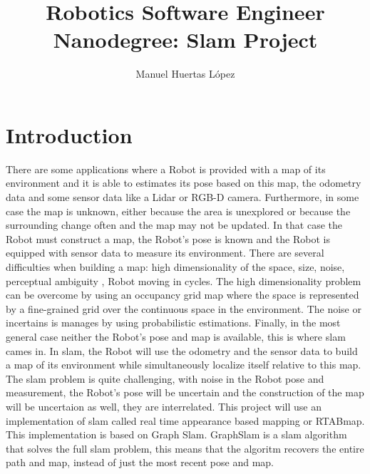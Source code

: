 \documentclass[10pt,journal,compsoc]{IEEEtran}
\begin{document}
	
\title{Robotics Software Engineer Nanodegree: Slam Project}
\author{Manuel Huertas L\'opez}

	
	
\maketitle
\IEEEdisplaynontitleabstractindextext
\IEEEpeerreviewmaketitle
\section{Introduction}
\label{sec:introduction}
\IEEEPARstart
{T}{here} are some applications where a Robot is provided with a map of its environment and it is able to estimates its pose based on this map, the odometry data and some sensor data like a Lidar or RGB-D camera. Furthermore, in some case the map is unknown, either because the area is unexplored or because the surrounding change often and the map may not be updated. In that case the Robot must construct a map, the Robot's pose is known and the Robot is equipped with sensor data to measure its environment. There are several difficulties when building a map: high dimensionality of the space, size, noise, perceptual ambiguity , Robot moving in cycles. The  high dimensionality problem can be overcome by using an occupancy grid map where the space is represented by a fine-grained grid over the continuous space in the environment. The noise or incertains is manages by using probabilistic estimations. Finally, in the most general case neither the Robot's pose and map is available, this is where slam cames in. In slam, the Robot will use the odometry and the sensor data to build a map of its environment while simultaneously localize itself relative to this map. The slam problem is quite challenging, with noise in the Robot pose and measurement, the Robot's pose will be uncertain and the construction of the map will be uncertaion as well, they are interrelated. This project will use an implementation of slam called real time appearance based mapping or RTABmap. This implementation is based on Graph Slam. GraphSlam is a slam algorithm that solves the full slam problem, this means that the algoritm recovers the entire path and map, instead of just the most recent pose and map.
\end{document}
